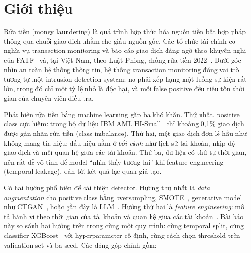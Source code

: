 \documentclass[sigconf,nonacm]{acmart}
\begin{document}

\maketitle
\pagestyle{plain}  %

\section{Giới thiệu}

Rửa tiền (money laundering) là quá trình hợp thức hóa nguồn tiền bất hợp pháp thông qua chuỗi giao dịch nhằm che
giấu nguồn gốc. Các tổ chức tài chính có nghĩa vụ transaction monitoring và báo cáo giao dịch đáng ngờ theo khuyến
nghị của FATF~\cite{fatf2012} và, tại Việt Nam, theo Luật Phòng, chống rửa tiền 2022~\cite{luatpcrt2022}. Dưới góc
nhìn an toàn hệ thống thông tin, hệ thống transaction monitoring đóng vai trò tương tự một intrusion detection system:
nó phải xếp hạng một luồng sự kiện rất lớn, trong đó chỉ một tỷ lệ nhỏ là độc hại, và mỗi false positive đều tiêu
tốn thời gian của chuyên viên điều tra.

Phát hiện rửa tiền bằng machine learning gặp ba khó khăn. Thứ nhất, positive class cực hiếm: trong bộ dữ liệu IBM
AML HI-Small~\cite{altman2023realistic} chỉ khoảng 0,1\% giao dịch được gán nhãn rửa tiền (class imbalance). Thứ hai,
một giao dịch đơn lẻ hầu như không mang tín hiệu; dấu hiệu nằm ở \emph{bối cảnh} như lịch sử tài khoản, nhịp độ
giao dịch và mối quan hệ giữa các tài khoản. Thứ ba, dữ liệu có thứ tự thời gian, nên rất dễ vô tình để model ``nhìn
thấy tương lai'' khi feature engineering (temporal leakage), dẫn tới kết quả lạc quan giả tạo.

Có hai hướng phổ biến để cải thiện detector. Hướng thứ nhất là \emph{data augmentation} cho positive class bằng
oversampling, SMOTE~\cite{chawla2002smote}, generative model như CTGAN~\cite{xu2019ctgan}, hoặc gần đây là
LLM~\cite{borisov2023great,seedat2024cllm}. Hướng thứ hai là \emph{feature engineering}: mô tả hành vi theo thời gian
của tài khoản và quan hệ giữa các tài khoản~\cite{blanusa2024gfp,deprez2024network}. Bài báo này so sánh hai hướng
trên trong cùng một quy trình: cùng temporal split, cùng classifier XGBoost~\cite{chen2016xgboost} với hyperparameter
cố định, cùng cách chọn threshold trên validation set và ba seed. Các đóng góp chính gồm:
\end{document}
